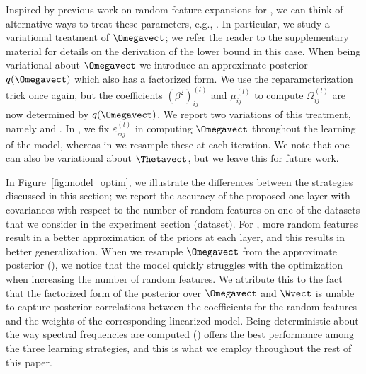 Inspired by previous work on random feature expansions for , we can think of alternative ways to treat these parameters, e.g., \citet{Gredilla10,Gal15}. 
In particular, we study a variational treatment of $\Omegavect$; we refer the reader to the supplementary material for details on the derivation of the lower bound in this case.
When being variational about $\Omegavect$ we introduce an approximate posterior $q(\Omegavect)$ which also has a factorized form.
We use the reparameterization trick once again, but the coefficients $(\beta^2)^{(l)}_{ij}$ and $\mu^{(l)}_{ij}$ to compute $\Omega^{(l)}_{ij}$ are now determined by $q(\Omegavect)$.
We report two variations of this treatment, namely  and .
In , we fix $\varepsilon^{(l)}_{rij}$ in computing $\Omegavect$ throughout the learning of the model, whereas in  we resample these at each iteration.
We note that one can also be variational about $\Thetavect$, but we leave this for future work.

In Figure~\ref{fig:model_optim}, we illustrate the differences between the strategies discussed in this section; %
we report the accuracy of the proposed one-layer \dgp with \rbf covariances with respect to the number of random features on one of the datasets that we consider in the experiment section (\eeg dataset).
For , more random features result in a better approximation of the \gp priors at each layer, and this results in better generalization. 
When we resample $\Omegavect$ from the approximate posterior (), we notice that the model quickly struggles with the optimization when increasing the number of random features. 
We attribute this to the fact that the factorized form of the posterior over $\Omegavect$ and $\Wvect$ is unable to capture posterior correlations between the coefficients for the random features and the weights of the corresponding linearized model. 
Being deterministic about the way spectral frequencies are computed () offers the best performance among the three learning strategies, and this is what we employ throughout the rest of this paper.

